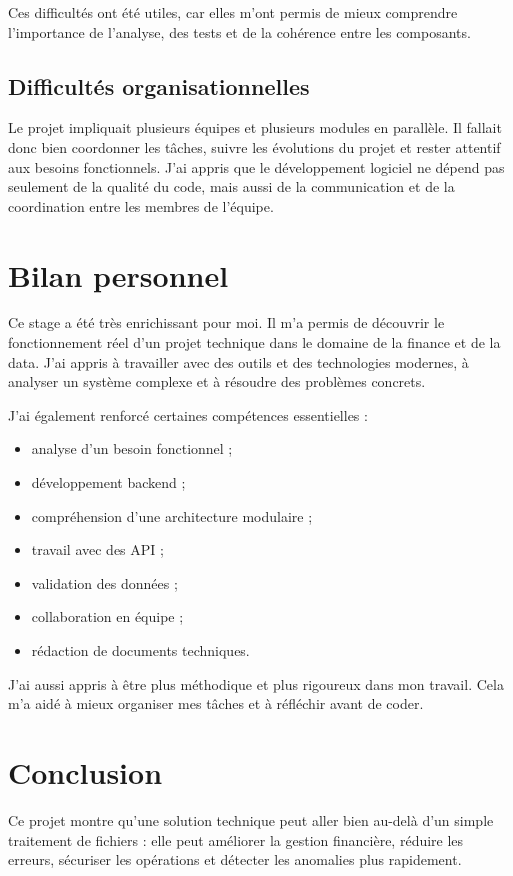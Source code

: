 ﻿\documentclass[12pt,a4paper]{report}
\begin{document}
Ces difficultés ont été utiles, car elles m'ont permis de mieux comprendre l'importance de l'analyse, des tests et de la cohérence entre les composants.

\section{Difficultés organisationnelles}
Le projet impliquait plusieurs équipes et plusieurs modules en parallèle. Il fallait donc bien coordonner les tâches, suivre les évolutions du projet et rester attentif aux besoins fonctionnels. J'ai appris que le développement logiciel ne dépend pas seulement de la qualité du code, mais aussi de la communication et de la coordination entre les membres de l'équipe.

\chapter{Bilan personnel}
Ce stage a été très enrichissant pour moi. Il m'a permis de découvrir le fonctionnement réel d'un projet technique dans le domaine de la finance et de la data. J'ai appris à travailler avec des outils et des technologies modernes, à analyser un système complexe et à résoudre des problèmes concrets.

J'ai également renforcé certaines compétences essentielles :
\begin{itemize}[leftmargin=1.5em]
    \item analyse d'un besoin fonctionnel ;
    \item développement backend ;
    \item compréhension d'une architecture modulaire ;
    \item travail avec des API ;
    \item validation des données ;
    \item collaboration en équipe ;
    \item rédaction de documents techniques.
\end{itemize}

J'ai aussi appris à être plus méthodique et plus rigoureux dans mon travail. Cela m'a aidé à mieux organiser mes tâches et à réfléchir avant de coder.

\chapter{Conclusion}
Ce projet montre qu'une solution technique peut aller bien au-delà d'un simple traitement de fichiers : elle peut améliorer la gestion financière, réduire les erreurs, sécuriser les opérations et détecter les anomalies plus rapidement.
\end{document}
